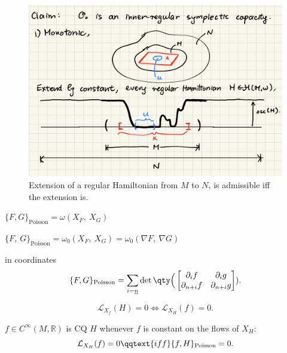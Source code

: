 \documentclass[../main-v2-manifolds.tex]{subfiles}
\begin{document}
\begin{figure}[h!]
    \centering
    \includegraphics[width=0.85\linewidth]{images/monotonicity-orbital-capacity.png}
    \caption{Extension of a regular Hamiltonian from $M$ to $N$, is admissible iff the extension is.}
    \label{fig:monotonicity of orbital capacity sketch image}
\end{figure}
\clearpage
\begin{description}
    \item[Symplectic Manifold $(M, \omega)$] 
    $\{ F, G \}_{\text{Poisson}} = \omega(X_F,\  X_G)$
    \item[Standard Symplectic Manifold $(\realtn,\omega_0)$] $\{ F,\  G \}_{\text{Poisson}} = \omega_0 (X_F,\ X_G) = \omega_0(\nabla F,\ \nabla G)$
    \item in coordinates
    \[
    \{F,G\}_{\text{Poisson}} = \sum_{i=\underline{n}}\det\qty\Big(\begin{bmatrix}
        \partial_i f & \partial_i g \\ 
        \partial_{n+i} f & \partial_{n+i} g 
    \end{bmatrix}).
\]
\item[Lie Algebra]
\[
\mathcal{L}_{X_f}(H) = 0 \iff \mathcal{L}_{X_H}(f) = 0.
\]
\item[Conserved Quantity] $f \in C^\infty(M, \mathbb{R})$ is CQ $H$ whenever $f$ is constant on the flows of $X_H$:
\[
\mathcal{L}_{X_H}(f) = 0 \qqtext{iff} \{ f, H \}_{\text{Poisson}} = 0.
\]    
\end{description}
\end{document}
